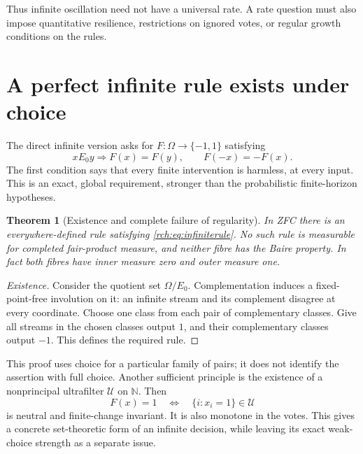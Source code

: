 \documentclass[11pt]{article}
\newtheorem{theorem}{Theorem}[section]
\theoremstyle{definition}
\theoremstyle{remark}
\newcommand{\N}{\mathbb N}
\begin{document}
Thus infinite oscillation need not have a universal rate. A rate question must
also impose quantitative resilience, restrictions on ignored votes, or regular
growth conditions on the rules.

\section{A perfect infinite rule exists under choice}
\label{rch:sec:choice}

The direct infinite version asks for \(F:\Omega\to\{-1,1\}\) satisfying
\begin{equation}
 x\mathrel{E_0}y\Longrightarrow F(x)=F(y),
 \qquad F(-x)=-F(x).
 \label{rch:eq:infiniterule}
\end{equation}
The first condition says that every finite intervention is harmless, at every
input. This is an exact, global requirement, stronger than the probabilistic
finite-horizon hypotheses.

\begin{theorem}[Existence and complete failure of regularity]
\label{rch:thm:choice}
In ZFC there is an everywhere-defined rule satisfying
\eqref{rch:eq:infiniterule}. No such rule is measurable for completed fair-product
measure, and neither fibre has the Baire property. In fact both fibres have
inner measure zero and outer measure one.
\end{theorem}

\begin{proof}[Existence]
Consider the quotient set \(\Omega/E_0\). Complementation induces a
fixed-point-free involution on it: an infinite stream and its complement
disagree at every coordinate. Choose one class from each pair of complementary
classes. Give all streams in the chosen classes output \(1\), and their
complementary classes output \(-1\). This defines the required rule.
\end{proof}

This proof uses choice for a particular family of pairs; it does not identify
the assertion with full choice. Another sufficient principle is the existence
of a nonprincipal ultrafilter \(\mathcal U\) on \(\N\). Then
\begin{equation}
 F(x)=1\quad\Longleftrightarrow\quad\{i:x_i=1\}\in\mathcal U
 \label{rch:eq:ultrafilter}
\end{equation}
is neutral and finite-change invariant. It is also monotone in the votes.
This gives a concrete set-theoretic form of an infinite decision, while leaving
its exact weak-choice strength as a separate issue.
\end{document}
